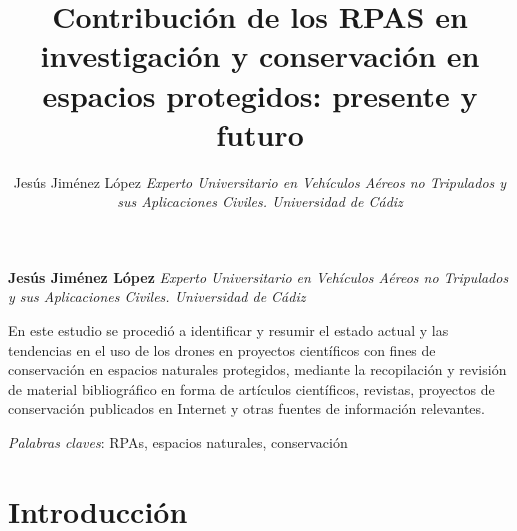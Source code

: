 \documentclass[11pt,]{article}
\title{Contribución de los RPAS en investigación y conservación en espacios
protegidos: presente y futuro  }
\author{\Large Jesús Jiménez López\vspace{0.05in} \newline\normalsize\emph{Experto Universitario en Vehículos Aéreos no Tripulados y sus
Aplicaciones Civiles. Universidad de Cádiz}  }
\date{}
\newcommand*{\authorfont}{\fontfamily{phv}\selectfont}
\renewenvironment{abstract}
 {{%
    \setlength{\leftmargin}{0mm}
    \setlength{\rightmargin}{\leftmargin}%
  }%
  \relax}
 {\endlist}
\begin{document}
	
%

{%
\setlength{\parindent}{0pt}
\thispagestyle{plain}
{\fontsize{18}{20}\selectfont\raggedright 
\maketitle  %

}

{
   \vskip 13.5pt\relax \normalsize\fontsize{11}{12} 
\textbf{\authorfont Jesús Jiménez López} \hskip 15pt \vskip 8.5pt  \emph{\small Experto Universitario en Vehículos Aéreos no Tripulados y sus
Aplicaciones Civiles. Universidad de Cádiz}   

}

}






\begin{abstract}

    \hbox{\vrule height .2pt width 39.14pc}

    \vskip 8.5pt %

\noindent En este estudio se procedió a identificar y resumir el estado actual y
las tendencias en el uso de los drones en proyectos científicos con
fines de conservación en espacios naturales protegidos, mediante la
recopilación y revisión de material bibliográfico en forma de artículos
científicos, revistas, proyectos de conservación publicados en Internet
y otras fuentes de información relevantes.


\vskip 8.5pt \noindent \emph{Palabras claves}: RPAs, espacios naturales, conservación \par

    \hbox{\vrule height .2pt width 39.14pc}



\end{abstract}


{
\hypersetup{linkcolor=black}
\setcounter{tocdepth}{2}
\tableofcontents
}


\vskip 6.5pt

\noindent \doublespacing \section{Introducción}\label{introduccion}
\end{document}
